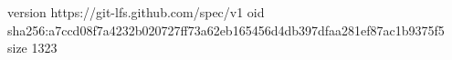 version https://git-lfs.github.com/spec/v1
oid sha256:a7ccd08f7a4232b020727ff73a62eb165456d4db397dfaa281ef87ac1b9375f5
size 1323

